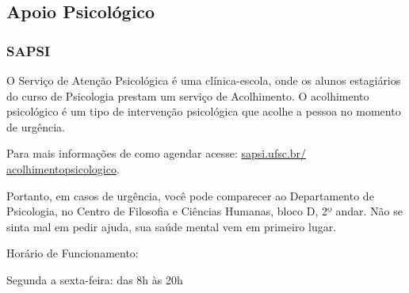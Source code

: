 \subsection{Apoio Psicológico}
\subsubsection{SAPSI}
O Serviço de Atenção Psicológica é uma clínica-escola, onde os alunos estagiários do curso de Psicologia prestam um serviço de Acolhimento.
O acolhimento psicológico é um tipo de intervenção psicológica que acolhe a pessoa no momento de urgência.

Para mais informações de como agendar acesse: \href{https://sapsi.ufsc.br/acolhimentopsicologico/}{sapsi.ufsc.br/ acolhimentopsicologico}.

Portanto, em casos de urgência, você pode comparecer ao Departamento de Psicologia, no Centro de Filosofia e Ciências Humanas, bloco D, 2º andar.
Não se sinta mal em pedir ajuda, sua saúde mental vem em primeiro lugar.

Horário de Funcionamento:

Segunda a sexta-feira: das 8h às 20h
